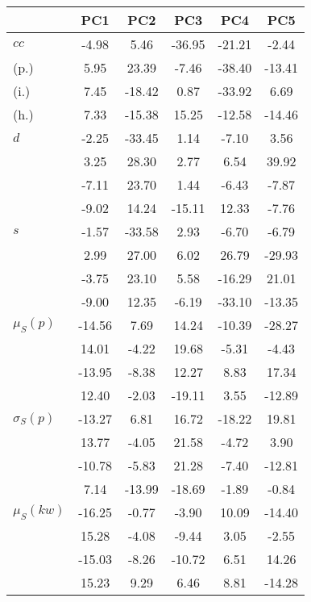 \begin{table}[h!]
\begin{center}
\begin{tabular}{| l | c | c | c | c | c |}\hline
 & PC1 & PC2 & PC3 & PC4 & PC5 \\\hline
$cc$ & -4.98  & 5.46  & -36.95  & -21.21  & -2.44 \\\hline
(p.) & 5.95  & 23.39  & -7.46  & -38.40  & -13.41 \\\hline
(i.) & 7.45  & -18.42  & 0.87  & -33.92  & 6.69 \\\hline
(h.) & 7.33  & -15.38  & 15.25  & -12.58  & -14.46 \\\hline
$d$ & -2.25  & -33.45  & 1.14  & -7.10  & 3.56 \\\hline
 & 3.25  & 28.30  & 2.77  & 6.54  & 39.92 \\\hline
 & -7.11  & 23.70  & 1.44  & -6.43  & -7.87 \\\hline
 & -9.02  & 14.24  & -15.11  & 12.33  & -7.76 \\\hline
$s$ & -1.57  & -33.58  & 2.93  & -6.70  & -6.79 \\\hline
 & 2.99  & 27.00  & 6.02  & 26.79  & -29.93 \\\hline
 & -3.75  & 23.10  & 5.58  & -16.29  & 21.01 \\\hline
 & -9.00  & 12.35  & -6.19  & -33.10  & -13.35 \\\hline
$\mu_S(p)$ & -14.56  & 7.69  & 14.24  & -10.39  & -28.27 \\\hline
 & 14.01  & -4.22  & 19.68  & -5.31  & -4.43 \\\hline
 & -13.95  & -8.38  & 12.27  & 8.83  & 17.34 \\\hline
 & 12.40  & -2.03  & -19.11  & 3.55  & -12.89 \\\hline
$\sigma_S(p)$ & -13.27  & 6.81  & 16.72  & -18.22  & 19.81 \\\hline
 & 13.77  & -4.05  & 21.58  & -4.72  & 3.90 \\\hline
 & -10.78  & -5.83  & 21.28  & -7.40  & -12.81 \\\hline
 & 7.14  & -13.99  & -18.69  & -1.89  & -0.84 \\\hline
$\mu_S(kw)$ & -16.25  & -0.77  & -3.90  & 10.09  & -14.40 \\\hline
 & 15.28  & -4.08  & -9.44  & 3.05  & -2.55 \\\hline
 & -15.03  & -8.26  & -10.72  & 6.51  & 14.26 \\\hline
 & 15.23  & 9.29  & 6.46  & 8.81  & -14.28 \\\hline

\end{tabular}
\end{center}
\end{table}
